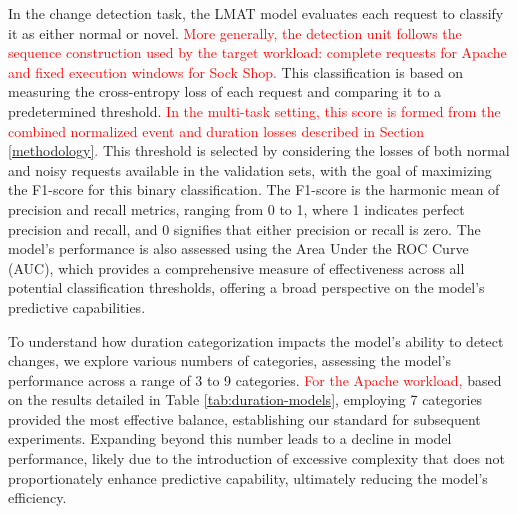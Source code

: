 \documentclass[preprint,12pt]{elsarticle}
\begin{document}
In the change detection task, the LMAT model evaluates each request to classify it as either normal or novel. \textcolor{red}{More generally, the detection unit follows the sequence construction used by the target workload: complete requests for Apache and fixed execution windows for Sock Shop.} This classification is based on measuring the cross-entropy loss of each request and comparing it to a predetermined threshold. \textcolor{red}{In the multi-task setting, this score is formed from the combined normalized event and duration losses described in Section \ref{methodology}.} This threshold is selected by considering the losses of both normal and noisy requests available in the validation sets, with the goal of maximizing the F1-score for this binary classification. The F1-score is the harmonic mean of precision and recall metrics, ranging from 0 to 1, where 1 indicates perfect precision and recall, and 0 signifies that either precision or recall is zero. The model's performance is also assessed using the Area Under the ROC Curve (AUC), which provides a comprehensive measure of effectiveness across all potential classification thresholds, offering a broad perspective on the model's predictive capabilities.

To understand how duration categorization impacts the model's ability to detect changes, we explore various numbers of categories, assessing the model's performance across a range of 3 to 9 categories. \textcolor{red}{For the Apache workload,} based on the results detailed in Table \ref{tab:duration-models}, employing 7 categories provided the most effective balance, establishing our standard for subsequent experiments. Expanding beyond this number leads to a decline in model performance, likely due to the introduction of excessive complexity that does not proportionately enhance predictive capability, ultimately reducing the model's efficiency.
\end{document}
